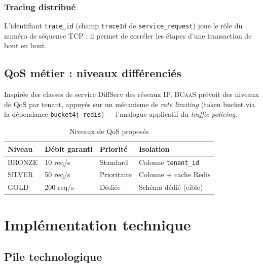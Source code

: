 \documentclass[12pt,a4paper]{report}
\theoremstyle{definition}
\theoremstyle{remark}
\newcommand{\bcaas}{\textsc{BCaaS}}
\begin{document}
\subsection{Tracing distribué}
L'identifiant \texttt{trace\_id} (champ \texttt{traceId} de \texttt{service\_request}) joue le rôle du numéro de séquence TCP : il permet de corréler les étapes d'une transaction de bout en bout.

\section{QoS métier : niveaux différenciés}

Inspirée des classes de service DiffServ des réseaux IP, \bcaas{} prévoit des niveaux de QoS par tenant, appuyés sur un mécanisme de \textit{rate limiting} (token bucket via la dépendance \texttt{bucket4j-redis}) — l'analogue applicatif du \textit{traffic policing}.

\begin{table}[h]
	\centering
	\caption{Niveaux de QoS proposés}
	\label{tab:qos}
	\begin{tabularx}{\textwidth}{lXXX}
		\toprule
		\textbf{Niveau} & \textbf{Débit garanti} & \textbf{Priorité} & \textbf{Isolation} \\
		\midrule
		BRONZE & 10 req/s & Standard & Colonne \texttt{tenant\_id} \\
		SILVER & 50 req/s & Prioritaire & Colonne + cache Redis \\
		GOLD & 200 req/s & Dédiée & Schéma dédié (cible) \\
		\bottomrule
	\end{tabularx}
\end{table}

\chapter{Implémentation technique}
\label{chap:impl}

\section{Pile technologique}
\end{document}
